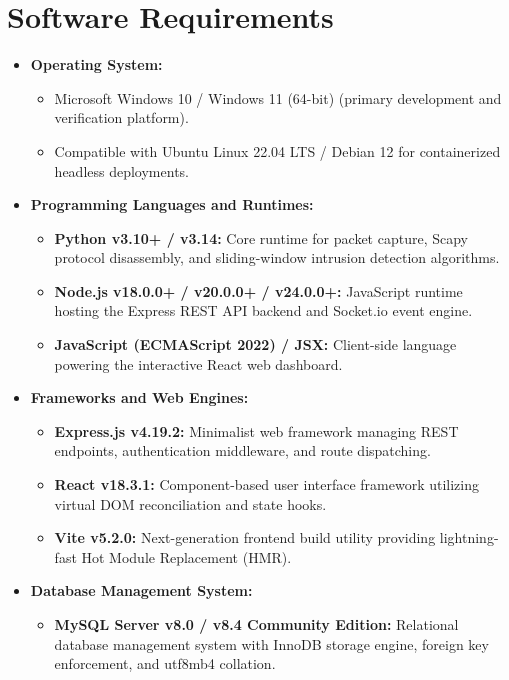 \documentclass[a4paper,12pt]{report}
\begin{document}
	\section{Software Requirements}
	\begin{itemize}
		\item \textbf{Operating System:}
		\begin{itemize}
			\item Microsoft Windows 10 / Windows 11 (64-bit) (primary development and verification platform).
			\item Compatible with Ubuntu Linux 22.04 LTS / Debian 12 for containerized headless deployments.
		\end{itemize}
		
		\item \textbf{Programming Languages and Runtimes:}
		\begin{itemize}
			\item \textbf{Python v3.10+ / v3.14:} Core runtime for packet capture, Scapy protocol disassembly, and sliding-window intrusion detection algorithms.
			\item \textbf{Node.js v18.0.0+ / v20.0.0+ / v24.0.0+:} JavaScript runtime hosting the Express REST API backend and Socket.io event engine.
			\item \textbf{JavaScript (ECMAScript 2022) / JSX:} Client-side language powering the interactive React web dashboard.
		\end{itemize}
		
		\item \textbf{Frameworks and Web Engines:}
		\begin{itemize}
			\item \textbf{Express.js v4.19.2:} Minimalist web framework managing REST endpoints, authentication middleware, and route dispatching.
			\item \textbf{React v18.3.1:} Component-based user interface framework utilizing virtual DOM reconciliation and state hooks.
			\item \textbf{Vite v5.2.0:} Next-generation frontend build utility providing lightning-fast Hot Module Replacement (HMR).
		\end{itemize}
		
		\item \textbf{Database Management System:}
		\begin{itemize}
			\item \textbf{MySQL Server v8.0 / v8.4 Community Edition:} Relational database management system with InnoDB storage engine, foreign key enforcement, and utf8mb4 collation.
		\end{itemize}
		

\end{itemize}
\end{document}
